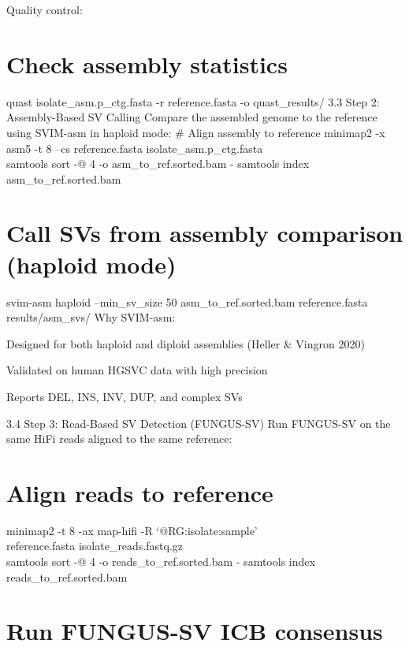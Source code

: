 \documentclass[
]{article}
\begin{document}
Quality control:

\hypertarget{check-assembly-statistics}{%
\section{Check assembly statistics}\label{check-assembly-statistics}}

quast isolate\_asm.p\_ctg.fasta -r reference.fasta -o quast\_results/
3.3 Step 2: Assembly-Based SV Calling Compare the assembled genome to
the reference using SVIM-asm in haploid mode: \# Align assembly to
reference minimap2 -x asm5 -t 8 --cs reference.fasta
isolate\_asm.p\_ctg.fasta\\
\textbar{} samtools sort -@ 4 -o asm\_to\_ref.sorted.bam - samtools
index asm\_to\_ref.sorted.bam

\hypertarget{call-svs-from-assembly-comparison-haploid-mode}{%
\section{Call SVs from assembly comparison (haploid
mode)}\label{call-svs-from-assembly-comparison-haploid-mode}}

svim-asm haploid --min\_sv\_size 50 asm\_to\_ref.sorted.bam
reference.fasta\\
results/asm\_svs/ Why SVIM-asm:

Designed for both haploid and diploid assemblies (Heller \& Vingron
2020)

Validated on human HGSVC data with high precision

Reports DEL, INS, INV, DUP, and complex SVs

3.4 Step 3: Read-Based SV Detection (FUNGUS-SV) Run FUNGUS-SV on the
same HiFi reads aligned to the same reference:

\hypertarget{align-reads-to-reference}{%
\section{Align reads to reference}\label{align-reads-to-reference}}

minimap2 -t 8 -ax map-hifi -R `@RG\tID:isolate\tSM:sample'\\
reference.fasta isolate\_reads.fastq.gz\\
\textbar{} samtools sort -@ 4 -o reads\_to\_ref.sorted.bam - samtools
index reads\_to\_ref.sorted.bam

\hypertarget{run-fungus-sv-icb-consensus}{%
\section{Run FUNGUS-SV ICB
consensus}\label{run-fungus-sv-icb-consensus}}
\end{document}

